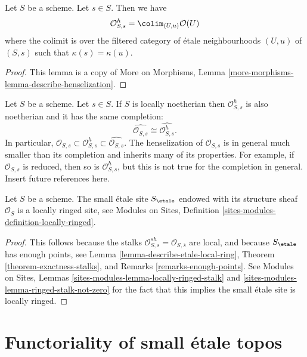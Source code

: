 \begin{lemma}
\label{lemma-describe-henselization}
Let $S$ be a scheme. Let $s \in S$. Then we have
$$
\mathcal{O}_{S, s}^h =
\colim_{(U, u)} \mathcal{O}(U)
$$
where the colimit is over the filtered category of
\'etale neighbourhoods $(U, u)$ of $(S, s)$ such that
$\kappa(s) = \kappa(u)$.
\end{lemma}

\begin{proof}
This lemma is a copy of
More on Morphisms, Lemma \ref{more-morphisms-lemma-describe-henselization}.
\end{proof}

\begin{remark}
\label{remark-henselization-Noetherian}
Let $S$ be a scheme. Let $s \in S$.
If $S$ is locally noetherian then $\mathcal{O}_{S, s}^h$
is also noetherian and it has the same completion:
$$
\widehat{\mathcal{O}_{S, s}} \cong \widehat{\mathcal{O}_{S, s}^h}.
$$
In particular,
$\mathcal{O}_{S, s} \subset
\mathcal{O}_{S, s}^h \subset
\widehat{\mathcal{O}_{S, s}}$.
The henselization of $\mathcal{O}_{S, s}$ is in general much
smaller than its completion and inherits many of its properties.
For example, if $\mathcal{O}_{S, s}$ is reduced, then so is
$\mathcal{O}_{S, s}^h$, but this is not true for the completion in general.
Insert future references here.
\end{remark}

\begin{lemma}
\label{lemma-etale-site-locally-ringed}
Let $S$ be a scheme. The small \'etale site $S_\etale$ endowed with
its structure sheaf $\mathcal{O}_S$ is a locally ringed site, see
Modules on Sites, Definition \ref{sites-modules-definition-locally-ringed}.
\end{lemma}

\begin{proof}
This follows because the stalks
$\mathcal{O}_{S, s}^{sh} = \mathcal{O}_{S, \overline{s}}$ are
local, and because $S_\etale$ has enough points, see
Lemma \ref{lemma-describe-etale-local-ring},
Theorem \ref{theorem-exactness-stalks},
and
Remarks \ref{remarks-enough-points}.
See
Modules on Sites, Lemmas \ref{sites-modules-lemma-locally-ringed-stalk} and
\ref{sites-modules-lemma-ringed-stalk-not-zero}
for the fact that this implies the small \'etale site is locally ringed.
\end{proof}






\section{Functoriality of small \'etale topos}
\label{section-functoriality}

